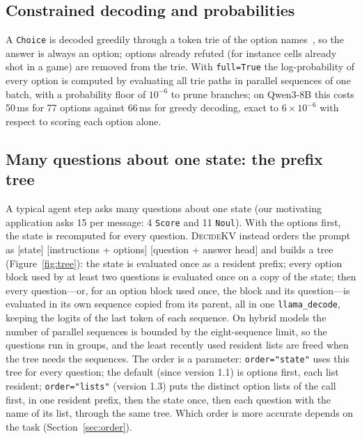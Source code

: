\documentclass[11pt]{article}
\newcommand{\dkv}{\textsc{DecideKV}}
\newcommand{\ms}{\,ms}
\begin{document}
\subsection{Constrained decoding and probabilities}\label{sec:decoding}
A \texttt{Choice} is decoded greedily through a token trie of the option names~\citep{genre}, so the answer is always
an option; options already refuted (for instance cells already shot in a game) are removed from the trie. With
\texttt{full=True} the log-probability of every option is computed by evaluating all trie paths in parallel
sequences of one batch, with a probability floor of $10^{-6}$ to prune branches; on Qwen3-8B this costs 50\ms{} for
77 options against 66\ms{} for greedy decoding, exact to $6\times 10^{-6}$ with respect to scoring each option alone.

\subsection{Many questions about one state: the prefix tree}\label{sec:tree}
A typical agent step asks many questions about one state (our motivating application asks 15 per message: 4
\texttt{Score} and 11 \texttt{Noul}). With the options first, the state is recomputed for every question. \dkv{}
instead orders the prompt as [state] [instructions + options] [question + answer head] and builds a tree
(Figure~\ref{fig:tree}): the state is evaluated once as a resident prefix; every option block used by at least two
questions is evaluated once on a copy of the state; then every question---or, for an option block used once, the block
and its question---is evaluated in its own sequence copied from its parent, all in one \texttt{llama\_decode}, keeping
the logits of the last token of each sequence. On hybrid models the number of parallel sequences is bounded by the
eight-sequence limit, so the questions run in groups, and the least recently used resident lists are freed when
the tree needs the sequences. The order is a parameter: \texttt{order="state"} uses this tree for every question;
the default (since version 1.1) is options first, each list resident; \texttt{order="lists"} (version 1.3) puts the
distinct option lists of the call first, in one resident prefix, then the state once, then each question with the name
of its list, through the same tree. Which order is more accurate depends on the task (Section~\ref{sec:order}).
\end{document}
